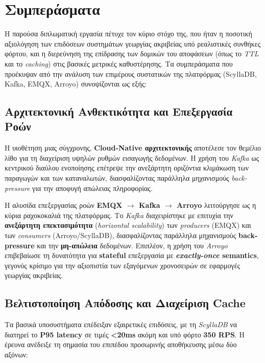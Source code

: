 \chapter{Συμπεράσματα}

Η παρούσα διπλωματική εργασία πέτυχε τον κύριο στόχο της, που ήταν η ποσοτική
αξιολόγηση των επιδόσεων συστημάτων γεωργίας ακριβείας υπό ρεαλιστικές συνθήκες
φόρτου, και η διερεύνηση της επίδρασης των δομικών του αποφάσεων (όπως το
\textit{TTL} και το \textit{caching}) στις βασικές μετρικές καθυστέρησης. Τα
συμπεράσματα που προέκυψαν από την ανάλυση των επιμέρους συστατικών της
πλατφόρμας (ScyllaDB, Kafka, EMQX, Arroyo) συνοψίζονται ως εξής:

\section{Αρχιτεκτονική Ανθεκτικότητα και Επεξεργασία Ροών}

Η υιοθέτηση μιας σύγχρονης, \textbf{Cloud-Native αρχιτεκτονικής} αποτέλεσε τον
θεμέλιο λίθο για τη διαχείριση υψηλών ρυθμών εισαγωγής δεδομένων. Η χρήση του
\textit{Kafka} ως κεντρικού διαύλου ενοποίησης επέτρεψε την ανεξάρτητη
οριζόντια κλιμάκωση των παραγωγών και των καταναλωτών, διασφαλίζοντας παράλληλα
μηχανισμούς \textit{back-pressure} για την αποφυγή απώλειας πληροφορίας.

Η αλυσίδα επεξεργασίας ροών \textbf{EMQX $\rightarrow$ Kafka $\rightarrow$
	Arroyo} λειτούργησε ως η κύρια ραχοκοκαλιά της πλατφόρμας. Το \textit{Kafka}
διαχειρίστηκε με επιτυχία την \textbf{ανεξάρτητη επεκτασιμότητα}
(\textit{horizontal scalability}) των \textit{producers} (EMQX) και των
\textit{consumers} (Arroyo/ScyllaDB), διασφαλίζοντας παράλληλα μηχανισμούς
\textbf{back-pressure} και την \textbf{μη-απώλεια} δεδομένων. Επιπλέον, η χρήση
του \textit{Arroyo} επιβεβαίωσε τη δυνατότητα για \textbf{stateful} επεξεργασία
με \textbf{\textit{exactly-once} semantics}, γεγονός κρίσιμο για την αξιοπιστία
των εξαγόμενων χρονοσειρών σε εφαρμογές γεωργίας ακριβείας.

\section{Βελτιστοποίηση Απόδοσης και Διαχείριση Cache}

Τα βασικά υποσυστήματα επέδειξαν εξαιρετικές επιδόσεις, με τη \textit{ScyllaDB}
να διατηρεί το \textbf{P95 latency} σε τιμές \textbf{<20ms} ακόμη και υπό φόρτο
\textbf{350 RPS}. Η έρευνα ανέδειξε τη σημασία του επιπέδου προσωρινής
αποθήκευσης μέσω δύο αξόνων:

